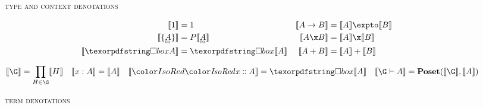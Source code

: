 \begin{figure*}
  \centering
  \textsc{type and context denotations}
  \vspace{2pt}

  \begin{align*}
    \den{\tunit} &= \terminalobject & \den{A \to B} &= \den{A} \expto \den{B}
    \\
    \den{\tseteq A} &= \pfinof{\den{\eqt A}}
    & \den{A \x B} &= \den{A} \x \den{B}
    \\
    \den{\iso A} &= \iso{\den{A}} & \den{A + B} &= \den{A} + \den{B}
  \end{align*}

  \begin{align*}
    \den{\G} &= \prod_{H \in \G} \den{H} &
    \den{\hm x A} &= \den{A} & \den{\hd x A} &= \iso{\den{A}} &
    \den{\G \vdash A} &= \Poset(\den\G, \den A)
  \end{align*}
  \vspace{-4pt}                  %

  \textsc{term denotations}
  \vspace{2pt}


\end{figure*}
